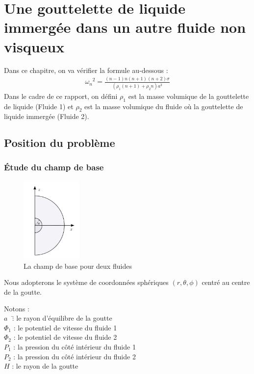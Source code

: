 \documentclass[a4paper]{report}
\begin{document}
\chapter{Une gouttelette de liquide immergée dans un autre fluide non visqueux}
Dans ce chapitre, on va vérifier la formule au-dessous :
\begin{eqnarray}
{\omega_n}^2 = \frac{ (n-1) n (n+1) (n+2) \sigma }{ ( \rho_1 (n+1) + \rho_2 n ) a^3 }
\end{eqnarray}
Dans le cadre de ce rapport, on défini $\rho_1$ est la masse volumique de la gouttelette de liquide (Fluide 1) et $\rho_2$ est la masse volumique du fluide où la gouttelette de liquide immergée (Fluide 2).
\section{Position du problème}
\subsection{Étude du champ de base}
\begin{figure}[!htbp]
\centering
\includegraphics[width=3cm]{3_1_1}
\caption{La champ de base pour deux fluides}
\end{figure}
Nous adopterons le système de coordonnées sphériques $(r,\theta,\phi)$ centré au centre de la goutte.
\begin{tabbing}
Notons :\\
$a$\,\    \= : le rayon d'équilibre de la goutte\\
$\varPhi_1$ \> : le potentiel de vitesse du fluide 1\\
$\varPhi_2$ \> : le potentiel de vitesse du fluide 2\\
$P_1$       \> : la pression du côté intérieur du fluide 1\\
$P_2$       \> : la pression du côté intérieur du fluide 2\\
$H$       \> : le rayon de la goutte
\end{tabbing}
\end{document}
